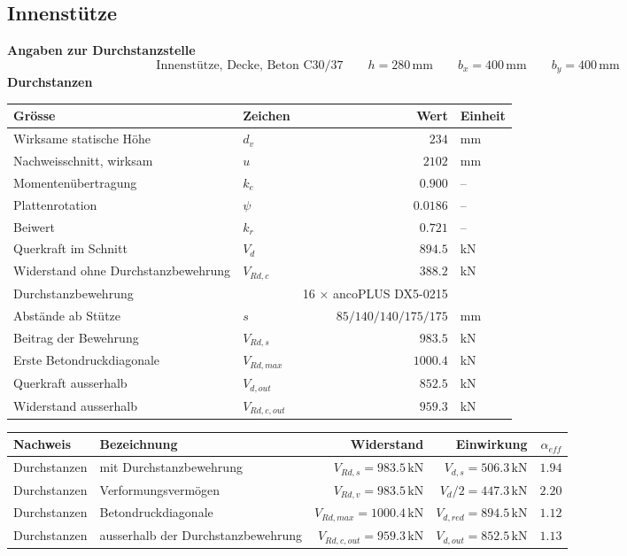 \documentclass[11pt,a4paper]{article}
\begin{document}
\subsection{Innenstütze}
\noindent\textbf{Angaben zur Durchstanzstelle}
\begin{equation*}
\text{Innenstütze, Decke, Beton C30/37} \qquad h = 280\,\mathrm{mm} \qquad b_x = 400\,\mathrm{mm} \qquad b_y = 400\,\mathrm{mm}
\end{equation*}
\noindent\textbf{Durchstanzen}
\begin{longtable}{llrl}
\hline
Grösse & Zeichen & Wert & Einheit \\
\hline
\endhead
Wirksame statische Höhe & $d_v$ & $234$ & mm \\
Nachweisschnitt, wirksam & $u$ & $2102$ & mm \\
Momentenübertragung & $k_e$ & $0.900$ & – \\
Plattenrotation & $\psi$ & $0.0186$ & – \\
Beiwert & $k_r$ & $0.721$ & – \\
Querkraft im Schnitt & $V_d$ & $894.5$ & kN \\
Widerstand ohne Durchstanzbewehrung & $V_{Rd,c}$ & $388.2$ & kN \\
Durchstanzbewehrung &  & 16 × ancoPLUS DX5-0215 &  \\
Abstände ab Stütze & $s$ & $85 / 140 / 140 / 175 / 175$ & mm \\
Beitrag der Bewehrung & $V_{Rd,s}$ & $983.5$ & kN \\
Erste Betondruckdiagonale & $V_{Rd,max}$ & $1000.4$ & kN \\
Querkraft ausserhalb & $V_{d,out}$ & $852.5$ & kN \\
Widerstand ausserhalb & $V_{Rd,c,out}$ & $959.3$ & kN \\
\hline
\end{longtable}
\begin{xltabular}{\linewidth}{>{\raggedright\arraybackslash}X>{\raggedright\arraybackslash}Xrrr}
\hline
Nachweis & Bezeichnung & Widerstand & Einwirkung & $\alpha_{eff}$ \\
\hline
\endhead
Durchstanzen & mit Durchstanzbewehrung & $V_{Rd,s} = 983.5\,\mathrm{kN}$ & $V_{d,s} = 506.3\,\mathrm{kN}$ & $1.94$ \\
Durchstanzen & Verformungsvermögen & $V_{Rd,v} = 983.5\,\mathrm{kN}$ & $V_d / 2 = 447.3\,\mathrm{kN}$ & $2.20$ \\
Durchstanzen & Betondruckdiagonale & $V_{Rd,max} = 1000.4\,\mathrm{kN}$ & $V_{d,red} = 894.5\,\mathrm{kN}$ & $1.12$ \\
Durchstanzen & ausserhalb der Durchstanzbewehrung & $V_{Rd,c,out} = 959.3\,\mathrm{kN}$ & $V_{d,out} = 852.5\,\mathrm{kN}$ & $1.13$ \\
\hline
\end{xltabular}
\end{document}
